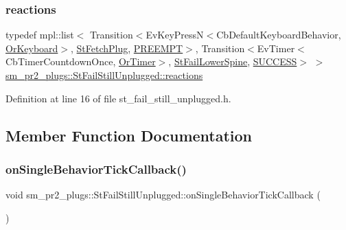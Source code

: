 \subsubsection{\texorpdfstring{reactions}{reactions}}
{\footnotesize\ttfamily typedef mpl\+::list$<$ Transition$<$Ev\+Key\+PressN$<$Cb\+Default\+Keyboard\+Behavior, \hyperlink{classsm__pr2__plugs_1_1OrKeyboard}{Or\+Keyboard}$>$, \hyperlink{structsm__pr2__plugs_1_1StFetchPlug}{St\+Fetch\+Plug}, \hyperlink{classPREEMPT}{P\+R\+E\+E\+M\+PT}$>$, Transition$<$Ev\+Timer$<$Cb\+Timer\+Countdown\+Once, \hyperlink{classsm__pr2__plugs_1_1OrTimer}{Or\+Timer}$>$, \hyperlink{structsm__pr2__plugs_1_1StFailLowerSpine}{St\+Fail\+Lower\+Spine}, \hyperlink{classSUCCESS}{S\+U\+C\+C\+E\+SS}$>$ $>$ \hyperlink{structsm__pr2__plugs_1_1StFailStillUnplugged_a58dc75afc3040293cac801248a1c999c}{sm\+\_\+pr2\+\_\+plugs\+::\+St\+Fail\+Still\+Unplugged\+::reactions}}



Definition at line 16 of file st\+\_\+fail\+\_\+still\+\_\+unplugged.\+h.



\subsection{Member Function Documentation}
\mbox{\label{structsm__pr2__plugs_1_1StFailStillUnplugged_ac9dc49f0681e4d6a17b30461881b9572}} 
\subsubsection{\texorpdfstring{on\+Single\+Behavior\+Tick\+Callback()}{onSingleBehaviorTickCallback()}}
{\footnotesize\ttfamily void sm\+\_\+pr2\+\_\+plugs\+::\+St\+Fail\+Still\+Unplugged\+::on\+Single\+Behavior\+Tick\+Callback (\begin{DoxyParamCaption}{ }\end{DoxyParamCaption})\hspace{0.3cm}{\ttfamily [inline]}}



